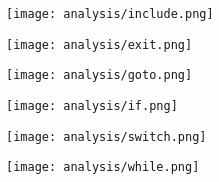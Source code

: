 \begin{multicols}{2}
\begin{center}
\texttt{[image: analysis/include.png]} 
\end{center}
\columnbreak
\begin{center}
\texttt{[image: analysis/exit.png]} 
\end{center}
\end{multicols}

\begin{multicols}{2}
\begin{center}
\texttt{[image: analysis/goto.png]} 
\end{center}
\columnbreak
\begin{center}
\texttt{[image: analysis/if.png]} 
\end{center}
\end{multicols}

\pagebreak
\begin{multicols}{2}
\begin{center}
\texttt{[image: analysis/switch.png]} 
\end{center}
\columnbreak
\begin{center}
\texttt{[image: analysis/while.png]} 
\end{center}
\end{multicols}

